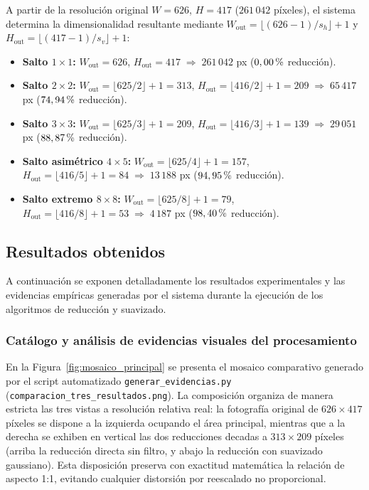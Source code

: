 \documentclass[11pt]{article}
\newcommand{\pct}{\ensuremath{\mathrm{\char37}}}
\begin{document}
A partir de la resolución original $W = 626$, $H = 417$ ($261\,042$ píxeles), el sistema determina la dimensionalidad resultante mediante $W_{\text{out}} = \lfloor (626-1)/s_h \rfloor + 1$ y $H_{\text{out}} = \lfloor (417-1)/s_v \rfloor + 1$:
\begin{itemize}[itemsep=0.2em]
\item \textbf{Salto $1 \times 1$:} $W_{\text{out}} = 626$, $H_{\text{out}} = 417 \;\Rightarrow\; 261\,042$ px ($0,00\,\pct$ reducción).
\item \textbf{Salto $2 \times 2$:} $W_{\text{out}} = \lfloor 625/2 \rfloor + 1 = 313$, $H_{\text{out}} = \lfloor 416/2 \rfloor + 1 = 209 \;\Rightarrow\; 65\,417$ px ($74,94\,\pct$ reducción).
\item \textbf{Salto $3 \times 3$:} $W_{\text{out}} = \lfloor 625/3 \rfloor + 1 = 209$, $H_{\text{out}} = \lfloor 416/3 \rfloor + 1 = 139 \;\Rightarrow\; 29\,051$ px ($88,87\,\pct$ reducción).
\item \textbf{Salto asimétrico $4 \times 5$:} $W_{\text{out}} = \lfloor 625/4 \rfloor + 1 = 157$, $H_{\text{out}} = \lfloor 416/5 \rfloor + 1 = 84 \;\Rightarrow\; 13\,188$ px ($94,95\,\pct$ reducción).
\item \textbf{Salto extremo $8 \times 8$:} $W_{\text{out}} = \lfloor 625/8 \rfloor + 1 = 79$, $H_{\text{out}} = \lfloor 416/8 \rfloor + 1 = 53 \;\Rightarrow\; 4\,187$ px ($98,40\,\pct$ reducción).
\end{itemize}

\subsection{Resultados obtenidos}
A continuación se exponen detalladamente los resultados experimentales y las evidencias empíricas generadas por el sistema durante la ejecución de los algoritmos de reducción y suavizado.

\subsubsection{Catálogo y análisis de evidencias visuales del procesamiento}

En la Figura~\ref{fig:mosaico_principal} se presenta el mosaico comparativo generado por el script automatizado \texttt{generar\_evidencias.py} (\texttt{comparacion\_tres\_resultados.png}). La composición organiza de manera estricta las tres vistas a resolución relativa real: la fotografía original de $626 \times 417$ píxeles se dispone a la izquierda ocupando el área principal, mientras que a la derecha se exhiben en vertical las dos reducciones decadas a $313 \times 209$ píxeles (arriba la reducción directa sin filtro, y abajo la reducción con suavizado gaussiano). Esta disposición preserva con exactitud matemática la relación de aspecto 1:1, evitando cualquier distorsión por reescalado no proporcional.
\end{document}
